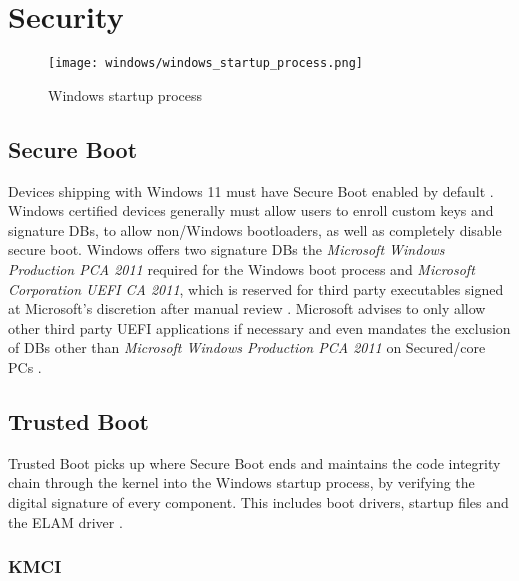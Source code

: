 
\section{Security}


\begin{figure}[htb]
    \centering
    \texttt{[image: windows/windows\_startup\_process.png]}
    \caption{Windows startup process \cite{microsoft-secure-the-windows-boot-process}}
    \label{fig:windows-startup-process}
\end{figure}

\subsection{Secure Boot}

Devices shipping with Windows 11 must have Secure Boot enabled by default \cite{microsoft-windows-minimum-hardware-requirements-overview}.
Windows certified devices generally must allow users to enroll custom keys and signature \acp{DB}, to allow non\-/Windows bootloaders, as well as completely disable secure boot.
Windows offers two signature \acp{DB} the \emph{Microsoft Windows Production PCA 2011} required for the Windows boot process and \emph{Microsoft Corporation \ac{UEFI} \ac{CA} 2011}, which is reserved for third party executables signed at Microsoft's discretion after manual review  \cite{microsoft-uefi-signing}.
Microsoft advises to only allow other third party \ac{UEFI} applications if necessary and even mandates the exclusion of \acp{DB} other than \emph{Microsoft Windows Production PCA 2011} on Secured\-/core \acp{PC} \cite{microsoft-secure-the-windows-boot-process}.

\subsection{Trusted Boot}

Trusted Boot picks up where Secure Boot ends and maintains the code integrity chain through the kernel into the Windows startup process, by verifying the digital signature of every component.
This includes boot drivers, startup files and the \ac{ELAM} driver \cite{microsoft-trusted-boot}.

\subsubsection{KMCI}
\cite{understanding-windows-trusted-boot}
